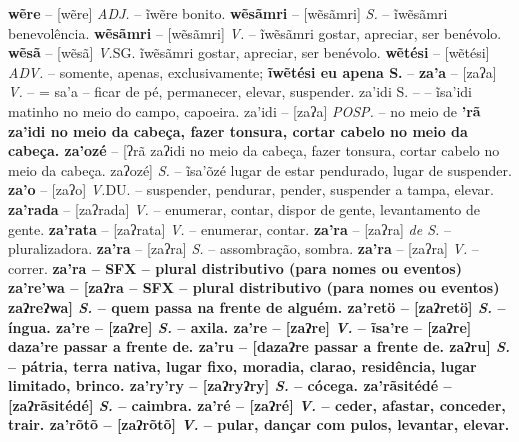 {{{{{{{{{{{{{\textbf{wẽre} -- [wẽre] \textit{ADJ.} -- ĩwẽre bonito.
\textbf{wẽsãmri} -- [wẽsãmri] \textit{S.} -- ĩwẽsãmri benevolência.
\textbf{wẽsãmri} -- [wẽsãmri] \textit{V.} -- ĩwẽsãmri gostar, apreciar, ser benévolo.
\textbf{wẽsã} -- [wẽsã] \textit{V.}SG. ĩwẽsãmri gostar, apreciar, ser benévolo.
\textbf{wẽtési} -- [wẽtési] \textit{ADV.} -- somente, apenas, exclusivamente;
\textbf{ĩwẽtési eu apena S.} -- \n%
\textbf{za'a} -- [zaʔa] \textit{V.} -- = sa'a -- ficar de pé, permanecer, elevar, suspender. za'idi S.} -- -- ĩsa'idi matinho no meio do campo, capoeira. za'idi} -- [zaʔa] \textit{POSP.} -- no meio de
\textbf{'rã za'idi no meio da cabeça, fazer tonsura, cortar cabelo no meio da cabeça. za'ozé} -- [ʔrã zaʔidi no meio da cabeça, fazer tonsura, cortar cabelo no meio da cabeça. zaʔozé] \textit{S.} -- ĩsa'õzé lugar de estar pendurado, lugar de suspender.
\textbf{za'o} -- [zaʔo] \textit{V.}DU. -- suspender, pendurar, pender, suspender a tampa, elevar.
\textbf{za'rada} -- [zaʔrada] \textit{V.} -- enumerar, contar, dispor de gente, levantamento de gente.
\textbf{za'rata} -- [zaʔrata] \textit{V.} -- enumerar, contar.
\textbf{za'ra} -- [zaʔra] \textit{de S.} -- pluralizadora.
\textbf{za'ra} -- [zaʔra] \textit{S.} -- assombração, sombra.
\textbf{za'ra} -- [zaʔra] \textit{V.} -- {correr}.
\textbf{za'ra -- {SFX -- {plural distributivo (para nomes ou eventos) za're'wa} -- [zaʔra -- {SFX -- {plural distributivo (para nomes ou eventos) zaʔreʔwa] \textit{S.} -- quem passa na frente de alguém.
\textbf{za'retö} -- [zaʔretö] \textit{S.} -- íngua.
\textbf{za're} -- [zaʔre] \textit{S.} -- axila.
\textbf{za're} -- [zaʔre] \textit{V.} -- ĩsa're} -- [zaʔre]
\textbf{daza're passar a frente de. za'ru} -- [dazaʔre passar a frente de. zaʔru] \textit{S.} -- pátria, terra nativa, lugar fixo, moradia, clarao, residência, lugar limitado, brinco.
\textbf{za'ry'ry} -- [zaʔryʔry] \textit{S.} -- cócega.
\textbf{za'rãsitédé} -- [zaʔrãsitédé] \textit{S.} -- caimbra.
\textbf{za'ré} -- [zaʔré] \textit{V.} -- ceder, afastar, conceder, trair.
\textbf{za'rõtõ} -- [zaʔrõtõ] \textit{V.} -- pular, dançar com pulos, levantar, elevar.
}}}}}}}}}}}}}}
